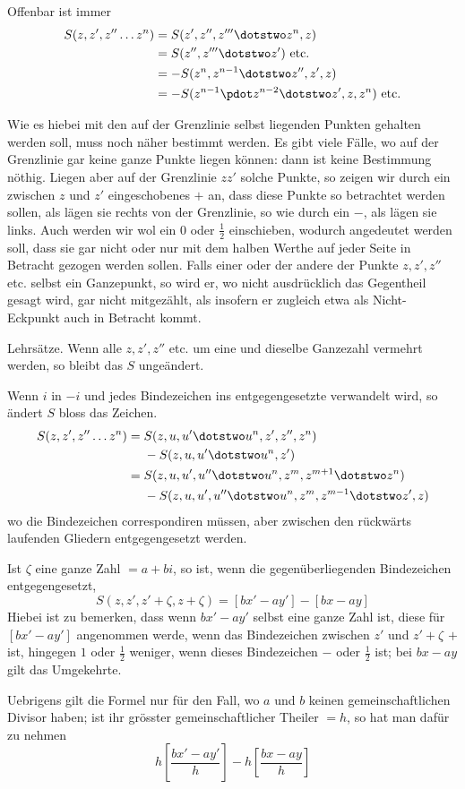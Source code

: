 Offenbar ist immer
\[
\begin{aligned}
S(z,z',z''\ldots z^n)&=S(z',z'',z'''\dotstwo z^n,z)\\
&=S(z'',z'''\dotstwo z')\text{ etc.}\\
&=-S(z^n,z^{n-1}\dotstwo z'',z',z)\\
&=-S(z^{n-1}\pdot z^{n-2}\dotstwo z',z,z^n)\text{ etc.}
\end{aligned}
\]

Wie es hiebei mit den auf der Grenzlinie selbst liegenden Punkten gehalten werden soll, muss noch näher bestimmt werden. Es gibt viele Fälle, wo auf der Grenzlinie gar keine ganze Punkte liegen können: dann ist keine Bestimmung nöthig. Liegen aber auf der Grenzlinie $zz'$ solche Punkte, so zeigen wir durch ein zwischen $z$ und $z'$ eingeschobenes $+$ an, dass diese Punkte so betrachtet werden sollen, als lägen sie rechts von der Grenzlinie, so wie durch ein $-$, als lägen sie links. Auch werden wir wol ein $0$ oder $\frac12$ einschieben, wodurch angedeutet werden soll, dass sie gar nicht oder nur mit dem halben Werthe auf
jeder Seite in Betracht gezogen werden sollen. Falls einer oder der andere der Punkte $z,z',z''$ etc. selbst ein Ganzepunkt, so wird er, wo nicht ausdrücklich das Gegentheil gesagt wird, gar nicht mitgezählt, als insofern er zugleich etwa als Nicht-Eckpunkt auch in Betracht kommt.

Lehrsätze. Wenn alle $z,z',z''$ etc. um eine und dieselbe Ganzezahl vermehrt werden, so bleibt das $S$ ungeändert.

Wenn $i$ in $-i$ und jedes Bindezeichen ins entgegengesetzte verwandelt wird, so ändert $S$ bloss das Zeichen.
\[
\begin{aligned}
S(z,z',z''\ldots z^n)={}&S(z,u,u'\dotstwo u^n,z',z'',z^n)\\
&-S(z,u,u'\dotstwo u^n,z')\\
={}&S(z,u,u',u''\dotstwo u^n,z^m,z^{m+1}\dotstwo z^n)\\
&-S(z,u,u',u''\dotstwo u^n,z^m,z^{m-1}\dotstwo z',z)
\end{aligned}
\]
wo die Bindezeichen correspondiren müssen, aber zwischen den rückwärts laufenden Gliedern entgegengesetzt werden.

Ist $\zeta$ eine ganze Zahl $=a+bi$, so ist, wenn die gegenüberliegenden Bindezeichen entgegengesetzt,
\[
S(z,z',z'+\zeta,z+\zeta)=[bx'-ay']-[bx-ay]
\]
Hiebei ist zu bemerken, dass wenn $bx'-ay'$ selbst eine ganze Zahl ist, diese für $[bx'-ay']$ angenommen werde, wenn das Bindezeichen zwischen $z'$ und $z'+\zeta$ $+$ ist, hingegen $1$ oder $\frac12$ weniger, wenn dieses Bindezeichen $-$ oder $\frac12$ ist; bei $bx-ay$ gilt das Umgekehrte.

Uebrigens gilt die Formel nur für den Fall, wo $a$ und $b$ keinen gemeinschaftlichen Divisor haben; ist ihr grösster gemeinschaftlicher Theiler $=h$, so hat man dafür zu nehmen
\[
h\left[\frac{bx'-ay'}h\right]-h\left[\frac{bx-ay}h\right]
\]


